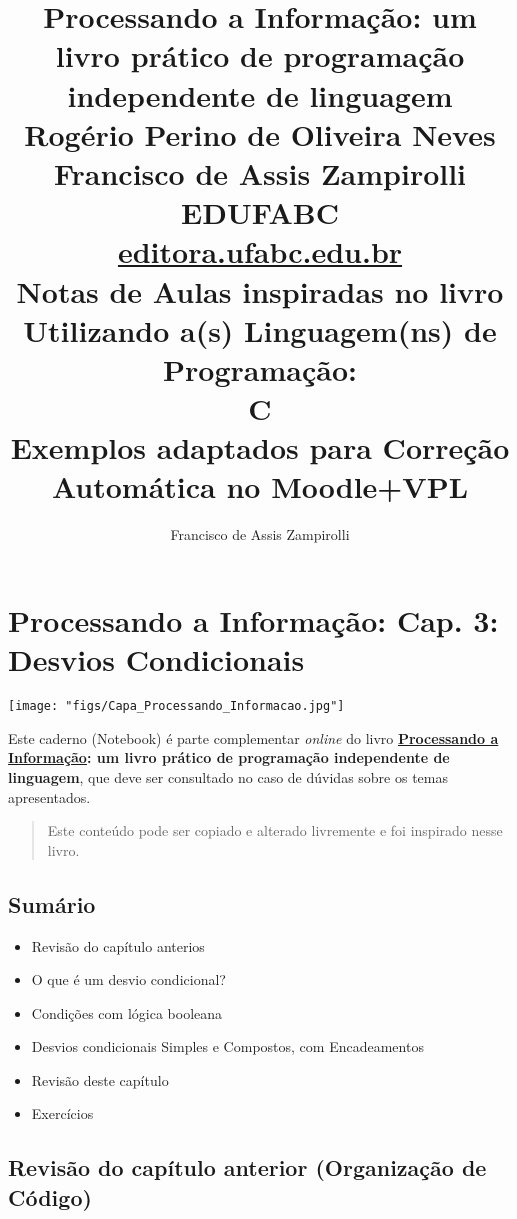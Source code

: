 \documentclass[12pt,a4paper]{article}
\title{Processando a Informação: um livro prático de programação independente de linguagem 
\\\large\vspace{2cm}
Rogério Perino de Oliveira Neves 
\\\vspace{5mm}
Francisco de Assis Zampirolli
\\\large\vspace{2cm}
EDUFABC
\\ \url{editora.ufabc.edu.br}
\\\Huge\vspace{3cm}
Notas de Aulas inspiradas no livro
\\\Large\vspace{1cm}
Utilizando a(s) Linguagem(ns) de Programação: 
\\\Huge\vspace{1cm}
C
\\\large\vspace{1cm}
Exemplos adaptados para Correção Automática no Moodle+VPL
\vspace{2cm}}
\author{Francisco de Assis Zampirolli\vspace{1cm}}
\providecommand{\tightlist}{%
      \setlength{\itemsep}{0pt}\setlength{\parskip}{0pt}}
\begin{document}
    
    
\clearpage\maketitle
\thispagestyle{empty}
\tableofcontents

    
    

    
    \hypertarget{processando-a-informauxe7uxe3o-cap.-3-desvios-condicionais}{%
\section{Processando a Informação: Cap. 3: Desvios
Condicionais}\label{processando-a-informauxe7uxe3o-cap.-3-desvios-condicionais}}

    \texttt{[image: "figs/Capa\_Processando\_Informacao.jpg"]}

Este caderno (Notebook) é parte complementar \emph{online} do livro
\textbf{\href{https://editora.ufabc.edu.br/matematica-e-ciencias-da-computacao/58-processando-a-informacao}{Processando
a Informação}: um livro prático de programação independente de
linguagem}, que deve ser consultado no caso de dúvidas sobre os temas
apresentados.

\begin{quote}
Este conteúdo pode ser copiado e alterado livremente e foi inspirado
nesse livro.
\end{quote}

    \hypertarget{sumuxe1rio}{%
\subsection{Sumário}\label{sumuxe1rio}}

\begin{itemize}
\tightlist
\item
  Revisão do capítulo anterios
\item
  O que é um desvio condicional?
\item
  Condições com lógica booleana
\item
  Desvios condicionais Simples e Compostos, com Encadeamentos
\item
  Revisão deste capítulo
\item
  Exercícios
\end{itemize}

    \hypertarget{revisuxe3o-do-capuxedtulo-anterior-organizauxe7uxe3o-de-cuxf3digo}{%
\subsection{Revisão do capítulo anterior (Organização de
Código)}\label{revisuxe3o-do-capuxedtulo-anterior-organizauxe7uxe3o-de-cuxf3digo}}
\end{document}
